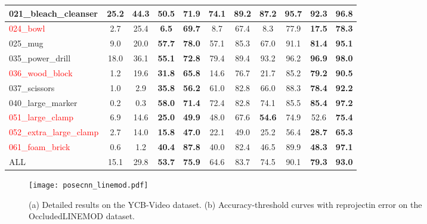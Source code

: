 \documentclass[conference]{IEEEtran}
\begin{document}
\begin{table*}
\begin{tabular}{|l|c|c|c|c||c|c|c|c|c|c|}
		\hline 021\_bleach\_cleanser & 25.2 & 44.3 & \textbf{50.5} & \textbf{71.9} & 74.1 & 89.2 & 87.2 & 95.7 & \textbf{92.3} & \textbf{96.8} \\
		\hline \textcolor{red}{024\_bowl} & 2.7 & 25.4 & \textbf{6.5} & \textbf{69.7} & 8.7 & 67.4 & 8.3 & 77.9 & \textbf{17.5} & \textbf{78.3} \\
		\hline 025\_mug & 9.0 & 20.0 & \textbf{57.7} & \textbf{78.0} & 57.1 & 85.3 & 67.0 & 91.1 & \textbf{81.4} & \textbf{95.1} \\
		\hline 035\_power\_drill & 18.0 & 36.1 & \textbf{55.1} & \textbf{72.8} & 79.4 & 89.4 & 93.2 & 96.2 & \textbf{96.9} & \textbf{98.0} \\
		\hline \textcolor{red}{036\_wood\_block} & 1.2 & 19.6 & \textbf{31.8} & \textbf{65.8} & 14.6 & 76.7 & 21.7 & 85.2 & \textbf{79.2} & \textbf{90.5} \\
		\hline 037\_scissors & 1.0 & 2.9 & \textbf{35.8} & \textbf{56.2} & 61.0 & 82.8 & 66.0 & 88.3 & \textbf{78.4} & \textbf{92.2} \\
		\hline 040\_large\_marker & 0.2 & 0.3 & \textbf{58.0} & \textbf{71.4} & 72.4 & 82.8 & 74.1 & 85.5 & \textbf{85.4} & \textbf{97.2} \\
		\hline \textcolor{red}{051\_large\_clamp} & 6.9 & 14.6 & \textbf{25.0} & \textbf{49.9} & 48.0 & 67.6 & \textbf{54.6} & 74.9 & 52.6 & \textbf{75.4} \\
		\hline \textcolor{red}{052\_extra\_large\_clamp} & 2.7 & 14.0 & \textbf{15.8} & \textbf{47.0} & 22.1 & 49.0 & 25.2 & 56.4 & \textbf{28.7} & \textbf{65.3} \\
		\hline \textcolor{red}{061\_foam\_brick} & 0.6 & 1.2 & \textbf{40.4} & \textbf{87.8} & 40.0 & 82.4 & 46.5 & 89.9 & \textbf{48.3} & \textbf{97.1} \\
		\hline
		\hline ALL & 15.1 & 29.8  & \textbf{53.7} & \textbf{75.9} & 64.6 & 83.7 & 74.5 & 90.1  & \textbf{79.3} & \textbf{93.0}  \\
		\hline
	\end{tabular}
	\vspace{-2mm}
\end{table*}


\begin{figure*}
	\centering
	\texttt{[image: posecnn\_linemod.pdf]}
	\caption{(a) Detailed results on the YCB-Video dataset. (b) Accuracy-threshold curves with reprojectin error on the OccludedLINEMOD dataset.}
	\label{fig::curves}
	\vspace{-6mm}
\end{figure*}
\end{document}
